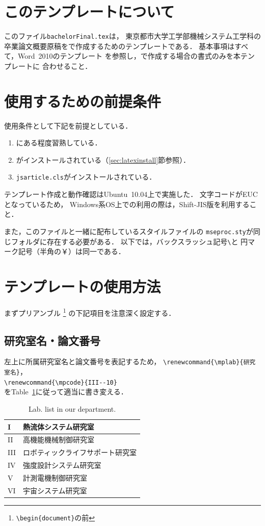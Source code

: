 \documentclass[onecolumn]{jsarticle}
\renewcommand{\mplab}{ロボティックライフサポート研究室}
\renewcommand{\mpcode}{III--10}
\begin{document}
\btitle
\section{このテンプレートについて}
このファイル\texttt{bachelorFinal.tex}は，
東京都市大学工学部機械システム工学科の
卒業論文概要原稿を\LaTeXe で作成するためのテンプレートである．
基本事項はすべて，Word~2010のテンプレート\cite{msetemplateB}
を参照し，\LaTeXe で作成する場合の書式のみを本テンプレートに
合わせること．


\section{使用するための前提条件}
使用条件として下記を前提としている．
\begin{enumerate}
\item \LaTeXe にある程度習熟している\cite{Okumura2000}．
\item \pLaTeXe がインストールされている（\ref{sec:latexinstall}節参照）．
\item \texttt{jsarticle.cls}がインストールされている\cite{Okumura2000}．
\end{enumerate}
テンプレート作成と動作確認はUbuntu~10.04上で実施した．
文字コードがEUCとなっているため，
Windows系OS上での利用の際は，Shift-JIS版を利用すること．

また，このファイルと一緒に配布しているスタイルファイルの
\texttt{mseproc.sty}が同じフォルダに存在する必要がある．
以下では，バックスラッシュ記号\verb+\+と
円マーク記号（半角の￥）は同一である．


\section{テンプレートの使用方法}
まずプリアンブル
\footnote{\verb+\begin{document}+の前}
の下記項目を注意深く設定する．

\subsection{研究室名・論文番号}
左上に所属研究室名と論文番号を表記するため，
\verb+\renewcommand{\mplab}{研究室名}+，\\
\verb+\renewcommand{\mpcode}{III--10}+ \\
をTable~\ref{table:lablist}に従って適当に書き変える．
%
\begin{table}[ht]
  \centering
  \caption{Lab. list in our department.}
  \label{table:lablist}
  \begin{tabular}{|l|l|}\hline
    I & 熱流体システム研究室 \\ \hline 
    II & 高機能機械制御研究室 \\ \hline
    III & ロボティックライフサポート研究室 \\ \hline 
    IV & 強度設計システム研究室 \\ \hline
    V & 計測電機制御研究室 \\ \hline
    VI & 宇宙システム研究室 \\ \hline
  \end{tabular}
\end{table}
\end{document}
